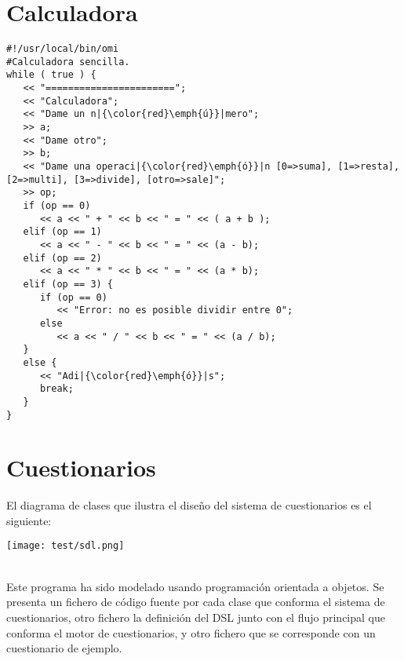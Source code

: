 \section{Calculadora}
\label{sec:calculadora}
\begin{lstlisting}[language=omi]
#!/usr/local/bin/omi
#Calculadora sencilla.
while ( true ) {
   << "=======================";
   << "Calculadora";
   << "Dame un n|{\color{red}\emph{ú}}|mero";
   >> a;
   << "Dame otro";
   >> b;
   << "Dame una operaci|{\color{red}\emph{ó}}|n [0=>suma], [1=>resta], [2=>multi], [3=>divide], [otro=>sale]"; 
   >> op;
   if (op == 0) 
      << a << " + " << b << " = " << ( a + b ); 
   elif (op == 1) 
      << a << " - " << b << " = " << (a - b);
   elif (op == 2) 
      << a << " * " << b << " = " << (a * b);
   elif (op == 3) {
      if (op == 0)
         << "Error: no es posible dividir entre 0";
      else 
         << a << " / " << b << " = " << (a / b);
   }
   else {
      << "Adi|{\color{red}\emph{ó}}|s";
      break;
   }
}
\end{lstlisting}

\section{Cuestionarios}
\label{sec:cuestionarios}
El diagrama de clases que ilustra el diseño del sistema de cuestionarios es el siguiente:

\begin{center}
\texttt{[image: test/sdl.png]} 
\end{center}
\hfill\\

Este programa ha sido modelado usando programación orientada a objetos. Se presenta un fichero de código fuente por cada clase que conforma el sistema de cuestionarios, otro fichero 
la definición del DSL junto con el flujo principal que conforma el motor de cuestionarios, y otro fichero que se corresponde con un cuestionario de ejemplo.\\

